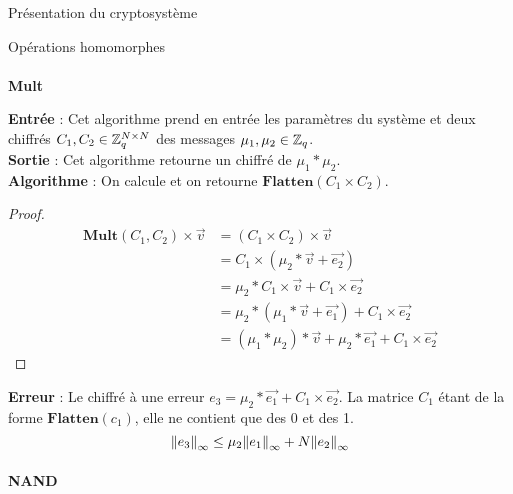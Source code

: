 \begin{section}{Présentation du cryptosystème}
\begin{subsection}{Opérations homomorphes}
	\paragraph{}
	\textbf{Mult}
	\flushleft
	
	\textbf{Entrée} : Cet algorithme prend en entrée les paramètres du système et deux chiffrés $C_1, C_2 \in \mathbb{Z}_q^{N \times N}$ des messages $\mu_1, \mu_2 \in \mathbb{Z}_q$.\\
	\textbf{Sortie} : Cet algorithme retourne un chiffré de $\mu_1 * \mu_2$. \\
	\textbf{Algorithme} : On calcule et on retourne $\textbf{Flatten}(C_1 \times C_2)$.
	\begin{proof}
	\begin{align*}
	\textbf{Mult}(C_1, C_2) \times \vec{v} &= (C_1 \times C_2) \times \vec{v} \\
	&= C_1 \times (\mu_2 * \vec{v} + \vec{e_2}) \\
	&= \mu_2 * C_1 \times \vec{v} + C_1 \times \vec{e_2} \\
	&= \mu_2 * (\mu_1 * \vec{v} + \vec{e_1}) + C_1 \times \vec{e_2} \\
	&= (\mu_1 * \mu_2) * \vec{v} + \mu_2 * \vec{e_1} + C_1 \times \vec{e_2}
	\end{align*}
	\end{proof}
	\textbf{Erreur} : Le chiffré à une erreur $e_3 = \mu_2 * \vec{e_1} + C_1 \times \vec{e_2}$. La matrice $C_1$ étant de la forme $\textbf{Flatten}(c_1)$, elle ne contient que des 0 et des 1. 
\[{\|e_3\|}_{\infty} \leq \mu_2 {\|e_1\|}_{\infty} + N {\|e_2\|}_{\infty} \]
	\paragraph{}
	\textbf{NAND}
	\flushleft
	

\end{subsection}
\end{section}
